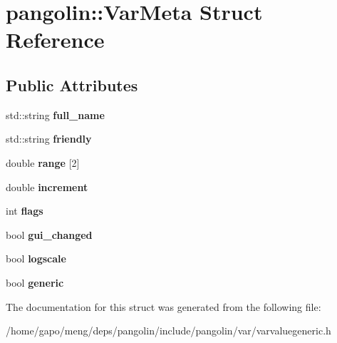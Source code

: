 \hypertarget{structpangolin_1_1_var_meta}{}\section{pangolin\+:\+:Var\+Meta Struct Reference}
\label{structpangolin_1_1_var_meta}
\subsection*{Public Attributes}
\begin{DoxyCompactItemize}
\item 
std\+::string {\bfseries full\+\_\+name}\hypertarget{structpangolin_1_1_var_meta_aaa7c74e619c399ea1d0774984d6bc774}{}\label{structpangolin_1_1_var_meta_aaa7c74e619c399ea1d0774984d6bc774}

\item 
std\+::string {\bfseries friendly}\hypertarget{structpangolin_1_1_var_meta_a3fbadd6262c30451c0e54a437362bcd2}{}\label{structpangolin_1_1_var_meta_a3fbadd6262c30451c0e54a437362bcd2}

\item 
double {\bfseries range} \mbox{[}2\mbox{]}\hypertarget{structpangolin_1_1_var_meta_a9a3d4262dae0dd8292a106dfaf8302f0}{}\label{structpangolin_1_1_var_meta_a9a3d4262dae0dd8292a106dfaf8302f0}

\item 
double {\bfseries increment}\hypertarget{structpangolin_1_1_var_meta_a2666e59d58a614c09faad95cca9fc650}{}\label{structpangolin_1_1_var_meta_a2666e59d58a614c09faad95cca9fc650}

\item 
int {\bfseries flags}\hypertarget{structpangolin_1_1_var_meta_a83d177e52526b210bffbba93cc1755b8}{}\label{structpangolin_1_1_var_meta_a83d177e52526b210bffbba93cc1755b8}

\item 
bool {\bfseries gui\+\_\+changed}\hypertarget{structpangolin_1_1_var_meta_a92e78c771a66c500dd901c4b76738569}{}\label{structpangolin_1_1_var_meta_a92e78c771a66c500dd901c4b76738569}

\item 
bool {\bfseries logscale}\hypertarget{structpangolin_1_1_var_meta_a26c9a8af4a6cc5842f70a7e8c7123580}{}\label{structpangolin_1_1_var_meta_a26c9a8af4a6cc5842f70a7e8c7123580}

\item 
bool {\bfseries generic}\hypertarget{structpangolin_1_1_var_meta_a110148551c546e95c63e537bb13bb30b}{}\label{structpangolin_1_1_var_meta_a110148551c546e95c63e537bb13bb30b}

\end{DoxyCompactItemize}


The documentation for this struct was generated from the following file\+:\begin{DoxyCompactItemize}
\item 
/home/gapo/meng/deps/pangolin/include/pangolin/var/varvaluegeneric.\+h\end{DoxyCompactItemize}
